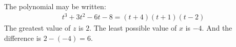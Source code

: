 The polynomial may be written:
\begin{align*}
t^{3} + 3t^{2} - 6t - 8 
= (t+4) (t+1) (t-2)
\end{align*}
The greatest value of $z$ is $2$. The least possible value of $x$ is $-4$. And the difference is $2-(-4)=6$.

